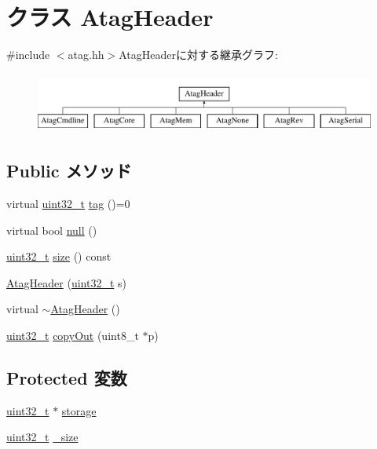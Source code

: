 \hypertarget{classAtagHeader}{
\section{クラス AtagHeader}
\label{classAtagHeader}
}


{\ttfamily \#include $<$atag.hh$>$}AtagHeaderに対する継承グラフ:\begin{figure}[H]
\begin{center}
\leavevmode
\includegraphics[height=2cm]{classAtagHeader}
\end{center}
\end{figure}
\subsection*{Public メソッド}
\begin{DoxyCompactItemize}
\item 
virtual \hyperlink{Type_8hh_a435d1572bf3f880d55459d9805097f62}{uint32\_\-t} \hyperlink{classAtagHeader_adad80b4c3e973afddab9e70f05faecd9}{tag} ()=0
\item 
virtual bool \hyperlink{classAtagHeader_a4af1ca4124e0ed6600fa7b8093eba309}{null} ()
\item 
\hyperlink{Type_8hh_a435d1572bf3f880d55459d9805097f62}{uint32\_\-t} \hyperlink{classAtagHeader_a213614ba4a6ad67fa2743a987609ca18}{size} () const 
\item 
\hyperlink{classAtagHeader_a156b78cd4f417d8c5d8f86931e29cdc1}{AtagHeader} (\hyperlink{Type_8hh_a435d1572bf3f880d55459d9805097f62}{uint32\_\-t} s)
\item 
virtual \hyperlink{classAtagHeader_ada4038ad574b03e7c1616d1b36374be4}{$\sim$AtagHeader} ()
\item 
\hyperlink{Type_8hh_a435d1572bf3f880d55459d9805097f62}{uint32\_\-t} \hyperlink{classAtagHeader_a685d2cec993b872c6370a1ee5c101dd0}{copyOut} (uint8\_\-t $\ast$p)
\end{DoxyCompactItemize}
\subsection*{Protected 変数}
\begin{DoxyCompactItemize}
\item 
\hyperlink{Type_8hh_a435d1572bf3f880d55459d9805097f62}{uint32\_\-t} $\ast$ \hyperlink{classAtagHeader_aec920815533132a07190032464816a9d}{storage}
\item 
\hyperlink{Type_8hh_a435d1572bf3f880d55459d9805097f62}{uint32\_\-t} \hyperlink{classAtagHeader_a6648b5bbe7815b247a1ba6f03e1daac0}{\_\-size}
\end{DoxyCompactItemize}


